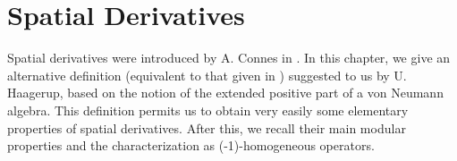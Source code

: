 
% 
\chapter{Spatial Derivatives}
Spatial derivatives were introduced by A. Connes in \cite{1}. In this chapter, we give an alternative definition (equivalent to that given in \cite{1}) suggested to us by U. Haagerup, based on the notion of the extended positive part of a von Neumann algebra. This definition permits us to obtain very easily some elementary properties of spatial derivatives. After this, we recall their main modular properties and the characterization as (-1)-homogeneous operators.\par
